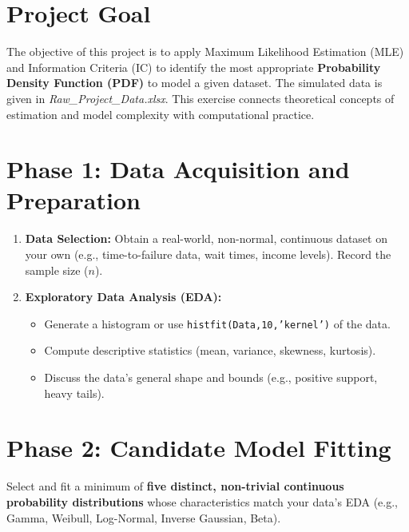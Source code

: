 \documentclass[12pt,thmsa]{article}
\begin{document}
\smallskip

\section{Project Goal}

\smallskip

The objective of this project is to apply Maximum Likelihood Estimation
(MLE) and Information Criteria (IC) to identify the most appropriate \textbf{%
Probability Density Function (PDF)} to model a given dataset. The simulated
data is given in \textsl{Raw\_Project\_Data.xlsx}. This exercise connects
theoretical concepts of estimation and model complexity with computational
practice.

\smallskip

\section{Phase 1: Data Acquisition and Preparation}

\begin{enumerate}
\item \textbf{Data Selection:} Obtain a real-world, non-normal, continuous
dataset on your own (e.g., time-to-failure data, wait times, income levels).
Record the sample size ($n$).

\item \textbf{Exploratory Data Analysis (EDA):}

\begin{itemize}
\item Generate a histogram or use \texttt{histfit(Data,10,'kernel')} of the
data.

\item Compute descriptive statistics (mean, variance, skewness, kurtosis).

\item Discuss the data's general shape and bounds (e.g., positive support,
heavy tails).
\end{itemize}
\end{enumerate}

\smallskip

\section{Phase 2: Candidate Model Fitting}

\smallskip

Select and fit a minimum of \textbf{five distinct, non-trivial continuous
probability distributions} whose characteristics match your data's EDA
(e.g., Gamma, Weibull, Log-Normal, Inverse Gaussian, Beta).
\end{document}

